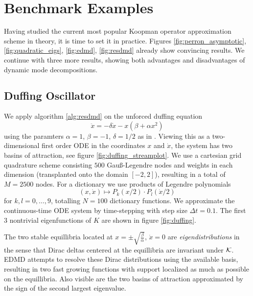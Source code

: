 
\section{Benchmark Examples}\label{sec:benchmark}

Having studied the current most popular Koopman operator approximation scheme in theory, 
it is time to set it in practice. Figures \ref{fig:perron_asymptotic}, 
\ref{fig:quadratic_eigs}, \ref{fig:edmd}, \ref{fig:resdmd} already show convincing 
results. We continue with three more results, showing both advantages and disadvantages 
of dynamic mode decompositions. 

\subsection{Duffing Oscillator}\label{sec:duffing}

We apply algorithm \ref{alg:resdmd} on the unforced duffing equation \cite{duffing}
\begin{equation}
    \label{eq:duffing}
    \ddot{x} = - \delta \dot{x} - x (\beta + \alpha x^2)
\end{equation}
using the paramters $\alpha = 1$, $\beta = -1$, $\delta = 1/2$ as in \cite{edmd}. Viewing 
this as a two-dimensional first order ODE in the coordinates $x$ and $\dot{x}$, the system 
has two basins of attraction, see figure \ref{fig:duffing_streamplot}. We use a cartesian 
grid quadrature scheme consisting $500$ Gauß-Legendre nodes and weights in each 
dimension (transplanted onto the domain $[-2,2]$), resulting in a total of $M = 2500$ 
nodes. For a dictionary we use products of Legendre polynomials
\begin{equation}
    (x, \dot{x}) \mapsto P_k (x/2) \cdot P_l (\dot{x}/2)
\end{equation}
for $k, l = 0, \ldots, 9$, totalling $N = 100$ dictionary functions. We approximate the 
continuous-time ODE system by time-stepping with step size $\Delta t = 0.1$. The first 
$3$ nontrivial eigenfunctions of $K$ are shown in figure \ref{fig:duffing}. 

The 
two stable equillibria located at $x = \pm \sqrt{\frac{\beta}{\alpha}}$, $\dot{x} = 0$ are 
\emph{eigendistributions} in the sense that Dirac deltas centered at the equillibria 
are invariant under $\mathcal{K}$. EDMD attempts to resolve these Dirac distributions using the 
available basis, resulting in two fast growing functions with support localized as much as 
possible on the equillibria. Also visible are the two basins of attraction approximated by 
the sign of the second largest eigenvalue. 

